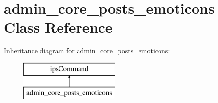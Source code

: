 \hypertarget{classadmin__core__posts__emoticons}{\section{admin\-\_\-core\-\_\-posts\-\_\-emoticons Class Reference}
\label{classadmin__core__posts__emoticons}
}
Inheritance diagram for admin\-\_\-core\-\_\-posts\-\_\-emoticons\-:\begin{figure}[H]
\begin{center}
\leavevmode
\includegraphics[height=2.000000cm]{classadmin__core__posts__emoticons}
\end{center}
\end{figure}
